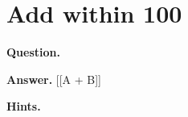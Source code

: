 \documentclass{article}
\begin{document}
\section*{Add within 100}
\textbf{Question.} 

\textbf{Answer.} [[A + B]]

\textbf{Hints.}
\begin{itemize}

\end{itemize}
\end{document}
